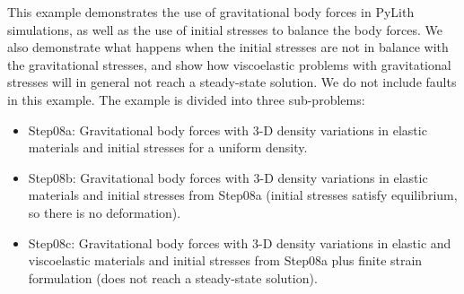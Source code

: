 This example demonstrates the use of gravitational body forces in
PyLith simulations, as well as the use of initial stresses to balance
the body forces. We also demonstrate what happens when the initial
stresses are not in balance with the gravitational stresses, and show
how viscoelastic problems with gravitational stresses will in general
not reach a steady-state solution. We do not include faults in
this example. The example is divided into three sub-problems:
\begin{itemize}
\item Step08a: Gravitational body forces with 3-D density variations
  in elastic materials and initial stresses for a uniform density.
\item Step08b: Gravitational body forces with 3-D density variations
  in elastic materials and initial stresses from Step08a (initial
  stresses satisfy equilibrium, so there is no deformation).
\item Step08c: Gravitational body forces with 3-D density variations
  in elastic and viscoelastic materials and initial stresses from
  Step08a plus finite strain formulation (does not reach a steady-state
  solution).
\end{itemize}

